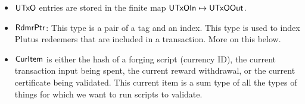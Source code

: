 \begin{itemize}
  \item $\mathsf{UTxO}$ entries are stored in the finite map $\mathsf{UTxOIn}\mapsto \mathsf{UTxOOut}$.

  \item $\mathsf{RdmrPtr}$: This type is a pair of a tag and an index. This type is
  used to index Plutus redeemers that are included in a transaction. More on this
  below.

  \item $\mathsf{CurItem}$ is either the hash of a
  forging script (currency ID), the current transaction input being
  spent, the current reward
  withdrawal, or the current certificate being validated.
  This current item is a sum type of all the types of things for which we want to
  run scripts to validate.

\end{itemize}


